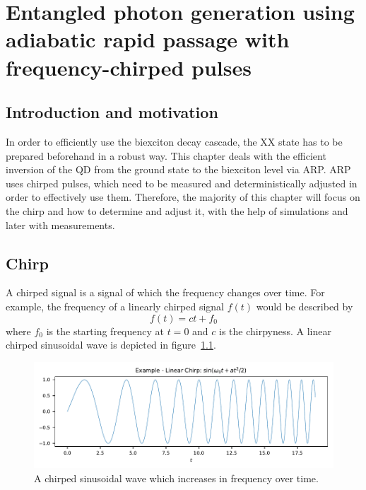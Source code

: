 \chapter{Entangled photon generation using adiabatic rapid passage with frequency-chirped pulses}
\label{cha:chirp}

\section{Introduction and motivation}

In order to efficiently use the biexciton decay cascade, the \acl{XX} state has to be prepared beforehand in a robust way.
This chapter deals with the efficient inversion of the \ac{QD} from the ground state to the biexciton level via \ac{ARP}.
\acs{ARP} uses chirped pulses, which need to be measured and deterministically adjusted in order to effectively use them.
Therefore, the majority of this chapter will focus on the chirp and how to determine and adjust it, with the help of simulations and later with measurements.


\section{Chirp}
\label{sec:chirp}
A chirped signal is a signal of which the frequency changes over time.
For example, the frequency of a linearly chirped signal $f(t)$ would be described by
\begin{equation}
f(t) = ct+f_0
\end{equation}
where $f_0$ is the starting frequency at $t=0$ and $c$ is the chirpyness. A linear chirped sinusoidal wave is depicted in figure~\ref{fig:chirped-sin}.

\begin{figure}[H]
	\centering
	\includegraphics[width=\linewidth]{figures/chirp/plots/chirped-sin}
	\caption{A chirped sinusoidal wave which increases in frequency over time.}
	\label{fig:chirped-sin}
\end{figure}

